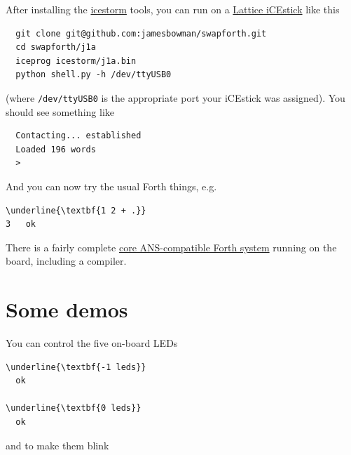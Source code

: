 \documentclass[10pt]{book}
\newcommand{\mach}[1]{\texttt{#1}}
\begin{document}
After installing the    
\href{http://www.clifford.at/icestorm/}{icestorm}
tools, you can run on a
\href{http://www.latticesemi.com/icestick}{Lattice iCEstick}
like this

\begin{framed}
\begin{Verbatim}
  git clone git@github.com:jamesbowman/swapforth.git
  cd swapforth/j1a
  iceprog icestorm/j1a.bin
  python shell.py -h /dev/ttyUSB0
\end{Verbatim}
\end{framed}

\noindent
(where \mach{/dev/ttyUSB0} is the appropriate port your iCEstick was assigned).
You should see something like

\begin{framed}
\begin{Verbatim}
  Contacting... established
  Loaded 196 words
  >
\end{Verbatim}
\end{framed}

And you can now try the usual Forth things, e.g.

\begin{framed}
\begin{Verbatim}[commandchars=\\\{\}]
\underline{\textbf{1 2 + .}}
3   ok
\end{Verbatim}
\end{framed}

There is a fairly complete 
\href{http://forth.sourceforge.net/std/dpans/dpans6.htm}{core ANS-compatible Forth system}
running on the board, including a compiler.

\section{Some demos}

You can control the five on-board LEDs 

\begin{framed}
\begin{Verbatim}[commandchars=\\\{\}]
\underline{\textbf{-1 leds}}
  ok

\underline{\textbf{0 leds}}
  ok
\end{Verbatim}
\end{framed}

\noindent
and to make them blink
\end{document}
